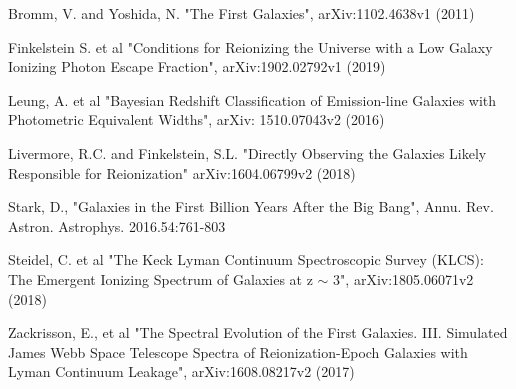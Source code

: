 \documentclass{aastex62}
\begin{document}
\begin{thebibliography}{}
Bromm, V. and Yoshida, N. "The First Galaxies", arXiv:1102.4638v1 (2011)

Finkelstein S. et al "Conditions for Reionizing the Universe with a Low Galaxy Ionizing Photon Escape Fraction", arXiv:1902.02792v1 (2019)

Leung, A. et al "Bayesian Redshift Classification of Emission-line Galaxies with Photometric Equivalent Widths", arXiv: 1510.07043v2 (2016)

Livermore, R.C. and Finkelstein, S.L. "Directly Observing the Galaxies Likely Responsible for Reionization" arXiv:1604.06799v2 (2018)

Stark, D., "Galaxies in the First Billion Years After the Big Bang", Annu. Rev. Astron. Astrophys. 2016.54:761-803

Steidel, C. et al "The Keck Lyman Continuum Spectroscopic Survey (KLCS): The Emergent Ionizing Spectrum of Galaxies at z $\sim$ 3", arXiv:1805.06071v2 (2018)


Zackrisson, E., et al "The Spectral Evolution of the First Galaxies. III. Simulated James Webb Space Telescope Spectra of Reionization-Epoch Galaxies with Lyman Continuum Leakage", arXiv:1608.08217v2 (2017)

\end{thebibliography}




\end{document}
